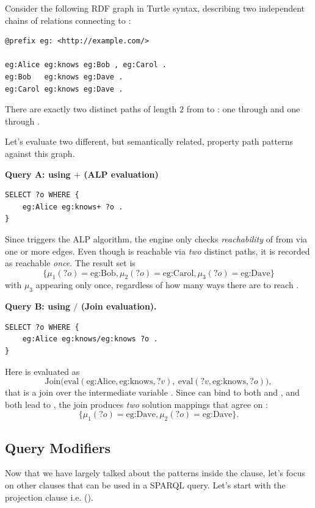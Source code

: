 \begin{example}{}
    Consider the following RDF graph in Turtle syntax, describing two independent chains of  relations connecting  to :
    \begin{lstlisting}
@prefix eg: <http://example.com/>

eg:Alice eg:knows eg:Bob , eg:Carol .
eg:Bob   eg:knows eg:Dave .
eg:Carol eg:knows eg:Dave .
    \end{lstlisting}
    There are exactly two distinct paths of length \(2\) from  to : one through  and one through .

    Let's evaluate two different, but semantically related, property path patterns against this graph.

    \textbf{Query A: using \(+\) (ALP evaluation)}
    \begin{lstlisting}
SELECT ?o WHERE {
    eg:Alice eg:knows+ ?o .
}
    \end{lstlisting}
    Since \code{+} triggers the ALP algorithm, the engine only checks \emph{reachability} of  from  via one or more  edges. Even though  is reachable via \emph{two} distinct paths, it is recorded as reachable \emph{once}. The result set is
    \[
        \{\mu_1(?o)=\text{eg:Bob}, \mu_2(?o)=\text{eg:Carol}, \mu_3(?o)=\text{eg:Dave}\}
    \]
    with \(\mu_3\) appearing only once, regardless of how many ways there are to reach .

    \textbf{Query B: using \(/\) (Join evaluation).}
    \begin{lstlisting}
SELECT ?o WHERE {
    eg:Alice eg:knows/eg:knows ?o .
}
    \end{lstlisting}
    Here  is evaluated as
    \[
        \text{Join}\big(\text{eval}(\text{eg:Alice}, \text{eg:knows}, ?v),\ \text{eval}(?v, \text{eg:knows}, ?o)\big),
    \]
    that is a join over the intermediate variable . Since  can bind to both  and , and both lead to , the join produces \emph{two} solution mappings that agree on :
    \[
        \{\mu_1(?o)=\text{eg:Dave}, \mu_2(?o)=\text{eg:Dave}\}.
    \]
\end{example}

\subsection{Query Modifiers}
Now that we have largely talked about the patterns inside the  clause, let's focus on other clauses that can be used in a SPARQL query. 
Let's start with the projection clause i.e. ().

